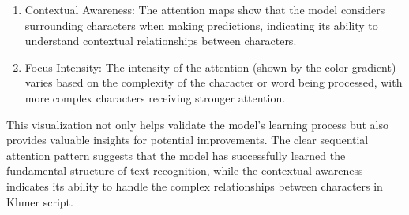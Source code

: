 {\begin{enumerate}
    \item Contextual Awareness: The attention maps show that the model considers surrounding characters when 
    making predictions, indicating its ability to understand contextual relationships between characters.
    
    \item Focus Intensity: The intensity of the attention (shown by the color gradient) varies based on the 
    complexity of the character or word being processed, with more complex characters receiving stronger attention.
\end{enumerate}

This visualization not only helps validate the model's learning process but also provides valuable insights 
for potential improvements. The clear sequential attention pattern suggests that the model has successfully 
learned the fundamental structure of text recognition, while the contextual awareness indicates its ability to 
handle the complex relationships between characters in Khmer script.

}